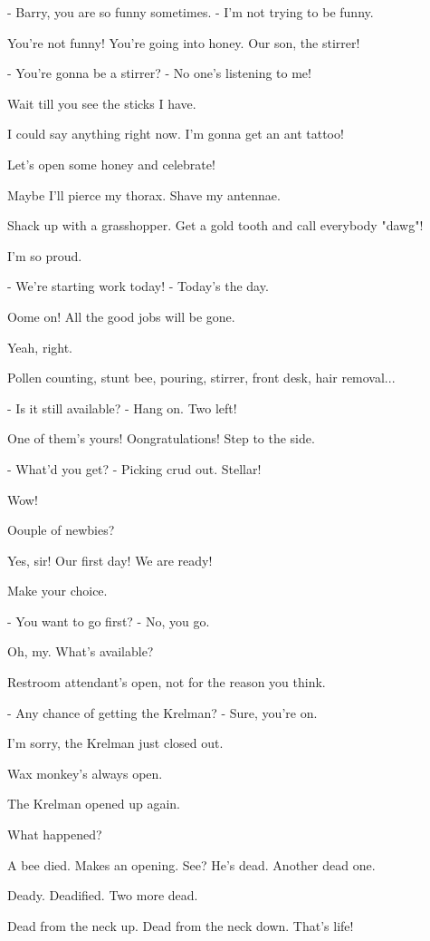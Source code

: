 \documentclass[journal]{IEEEtran}
\begin{document}
  
- Barry, you are so funny sometimes.
- I'm not trying to be funny.

  
You're not funny! You're going
into honey. Our son, the stirrer!

  
- You're gonna be a stirrer?
- No one's listening to me!

  
Wait till you see the sticks I have.

  
I could say anything right now.
I'm gonna get an ant tattoo!

  
Let's open some honey and celebrate!

  
Maybe I'll pierce my thorax.
Shave my antennae.

  
Shack up with a grasshopper. Get
a gold tooth and call everybody "dawg"!

  
I'm so proud.

  
- We're starting work today!
- Today's the day.

  
Oome on! All the good jobs
will be gone.

  
Yeah, right.

  
Pollen counting, stunt bee, pouring,
stirrer, front desk, hair removal...

  
- Is it still available?
- Hang on. Two left!

  
One of them's yours! Oongratulations!
Step to the side.

  
- What'd you get?
- Picking crud out. Stellar!

  
Wow!

  
Oouple of newbies?

  
Yes, sir! Our first day! We are ready!

  
Make your choice.

  
- You want to go first?
- No, you go.

  
Oh, my. What's available?

  
Restroom attendant's open,
not for the reason you think.

  
- Any chance of getting the Krelman?
- Sure, you're on.

  
I'm sorry, the Krelman just closed out.

  
Wax monkey's always open.

  
The Krelman opened up again.

  
What happened?

  
A bee died. Makes an opening. See?
He's dead. Another dead one.

  
Deady. Deadified. Two more dead.

  
Dead from the neck up.
Dead from the neck down. That's life!
\end{document}
